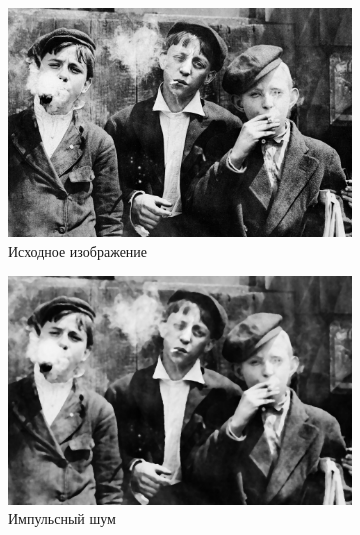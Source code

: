\begin{figure}[ht!] 
    \centering
    \begin{subfigure}[b]{0.5\linewidth}
        \centering
        \includegraphics[width=0.95\linewidth]{../lewis-hine-taschen-main-3.jpg} 
        \caption{Исходное изображение} 
        \label{median_7:a} 
        \vspace{4ex}
    \end{subfigure}%
    \begin{subfigure}[b]{0.5\linewidth}
      \centering
      \includegraphics[width=0.95\linewidth]{../Median_FIlter/Median_Impulse_noise_(k=7).jpg} 
      \caption{Импульсный шум} 
      \label{median_7:b} 
      \vspace{4ex}
    \end{subfigure}
    \begin{subfigure}[b]{0.5\linewidth}
      \centering

\end{subfigure}
\end{figure}
